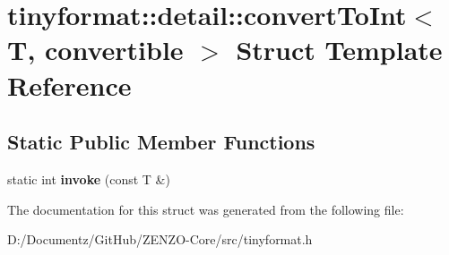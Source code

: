 \hypertarget{structtinyformat_1_1detail_1_1convert_to_int}{}\section{tinyformat\+::detail\+::convert\+To\+Int$<$ T, convertible $>$ Struct Template Reference}
\label{structtinyformat_1_1detail_1_1convert_to_int}
\subsection*{Static Public Member Functions}
\begin{DoxyCompactItemize}
\item 
\mbox{\label{structtinyformat_1_1detail_1_1convert_to_int_a1e1c0d85c6afc3bb21d2bc9458b3feb1}} 
static int {\bfseries invoke} (const T \&)
\end{DoxyCompactItemize}


The documentation for this struct was generated from the following file\+:\begin{DoxyCompactItemize}
\item 
D\+:/\+Documentz/\+Git\+Hub/\+Z\+E\+N\+Z\+O-\/\+Core/src/tinyformat.\+h\end{DoxyCompactItemize}
